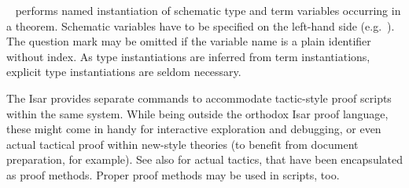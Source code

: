 \begin{isabellebody}
\begin{isamarkuptext}
\begin{description}
  \item \hyperlink{attribute.where}{\mbox{}}~
  performs named instantiation of schematic type and term variables
  occurring in a theorem.  Schematic variables have to be specified on
  the left-hand side (e.g.\ ).  The question mark may
  be omitted if the variable name is a plain identifier without index.
  As type instantiations are inferred from term instantiations,
  explicit type instantiations are seldom necessary.

  \end{description}%
\end{isamarkuptext}%
\isamarkuptrue%
%
\isamarkuptrue%
%
\begin{isamarkuptext}%
The Isar provides separate commands to accommodate tactic-style
  proof scripts within the same system.  While being outside the
  orthodox Isar proof language, these might come in handy for
  interactive exploration and debugging, or even actual tactical proof
  within new-style theories (to benefit from document preparation, for
  example).  See also  for actual tactics, that
  have been encapsulated as proof methods.  Proper proof methods may
  be used in scripts, too.


\end{isamarkuptext}
\end{isabellebody}
